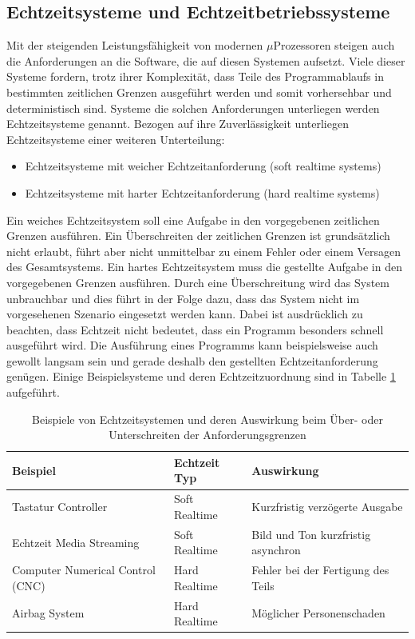 

\subsection{Echtzeitsysteme und Echtzeitbetriebssysteme}
\label{sec:Echtzeitsysteme}
Mit der steigenden Leis\-tungs\-fähig\-keit von modernen $\mu$Pro\-zesso\-ren steigen auch die Anforderungen an die Software, die auf diesen Systemen aufsetzt. Viele dieser Systeme fordern, trotz ihrer Komplexität, dass Teile des Pro\-gramm\-ab\-laufs in bestimmten zeitlichen Grenzen aus\-ge\-führt werden und somit vorhersehbar und deterministisch\cite{9780128015070} sind.
Systeme die solchen Anforderungen unterliegen werden Echtzeitsysteme genannt. Bezogen auf ihre Zuverlässigkeit unterliegen Echtzeitsysteme einer weiteren Unterteilung:
\begin{itemize}
	\item Echtzeitsysteme mit weicher Echtzeitanforderung (soft realtime systems)
	\item Echtzeitsysteme mit harter Echtzeitanforderung (hard realtime systems)
\end{itemize}
   Ein weiches Echtzeitsystem soll eine Aufgabe in den vorgegebenen zeitlichen Grenzen ausführen. Ein Über\-schrei\-ten der zeitlichen Grenzen ist grundsätzlich nicht erlaubt, führt aber nicht unmittelbar zu einem Fehler oder einem Versagen des Gesamtsystems. Ein hartes Echtzeitsystem muss die gestellte Aufgabe in den vorgegebenen Grenzen aus\-füh\-ren. Durch eine Über\-schrei\-tung wird das System unbrauchbar und dies führt in der Folge dazu, dass das System nicht im vorgesehenen Szenario eingesetzt werden kann. Dabei ist ausdrücklich zu beachten, dass Echtzeit nicht bedeutet, dass ein Programm besonders schnell ausgeführt wird. Die Ausführung eines Programms kann beispielsweise auch gewollt langsam sein und gerade deshalb den gestellten Echtzeitanforderung genügen. Einige Beispielsysteme und deren Echtzeitzuordnung sind in Tabelle \ref{tab:BeispieleEchtzeitsystem} aufgeführt. 
\begin{table}
\centering
	\begin{tabular}{|l|l|l|}
		\hline
		\textbf{Beispiel} & \textbf{Echtzeit Typ}  & \textbf{Auswirkung} \\
		\hline
		Tastatur Controller & Soft Realtime & Kurzfristig verzögerte Ausgabe \\
		\hline
		Echtzeit Media Streaming  & Soft Realtime & Bild und Ton kurzfristig asynchron \\
		\hline
		Computer Numerical Control (CNC)  & Hard Realtime & Fehler bei der Fertigung des Teils\\
		\hline
		Airbag System  & Hard Realtime & Möglicher Personenschaden\\
		\hline
	\end{tabular}
	\caption{Beispiele von Echtzeitsystemen und deren Auswirkung beim Über- oder Unterschreiten der Anforderungsgrenzen}
	\label{tab:BeispieleEchtzeitsystem}
\end{table}
